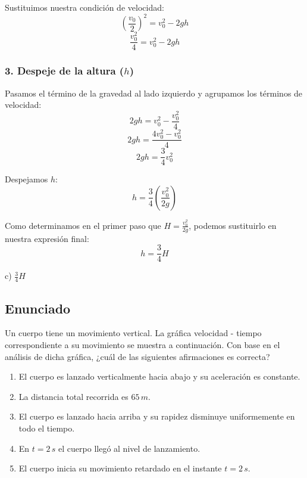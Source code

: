 \documentclass[12pt, a4paper]{article}
\begin{document}
Sustituimos nuestra condición de velocidad:
$$ \left(\frac{v_0}{2}\right)^2 = v_0^2 - 2gh $$
$$ \frac{v_0^2}{4} = v_0^2 - 2gh $$

\subsubsection*{3. Despeje de la altura ($h$)}
Pasamos el término de la gravedad al lado izquierdo y agrupamos los términos de velocidad:
$$ 2gh = v_0^2 - \frac{v_0^2}{4} $$
$$ 2gh = \frac{4v_0^2 - v_0^2}{4} $$
$$ 2gh = \frac{3}{4}v_0^2 $$

Despejamos $h$:
$$ h = \frac{3}{4} \left(\frac{v_0^2}{2g}\right) $$

Como determinamos en el primer paso que $H = \frac{v_0^2}{2g}$, podemos sustituirlo en nuestra expresión final:
$$ h = \frac{3}{4}H $$

\begin{tcolorbox}[colback=green!5!white, colframe=green!50!black, title=Respuesta Final]
\centering \Large c) $\frac{3}{4}H$
\end{tcolorbox}

\newpage

\subsection*{Enunciado}
Un cuerpo tiene un movimiento vertical. La gráfica velocidad - tiempo correspondiente a su movimiento se muestra a continuación. Con base en el análisis de dicha gráfica, ¿cuál de las siguientes afirmaciones es correcta?

\begin{enumerate}[label=\alph*)]
    \item El cuerpo es lanzado verticalmente hacia abajo y su aceleración es constante.
    \item La distancia total recorrida es $65 \, \si{m}$.
    \item El cuerpo es lanzado hacia arriba y su rapidez disminuye uniformemente en todo el tiempo.
    \item En $t = 2 \, \si{s}$ el cuerpo llegó al nivel de lanzamiento.
    \item El cuerpo inicia su movimiento retardado en el instante $t = 2 \, \si{s}$.
\end{enumerate}
\end{document}

